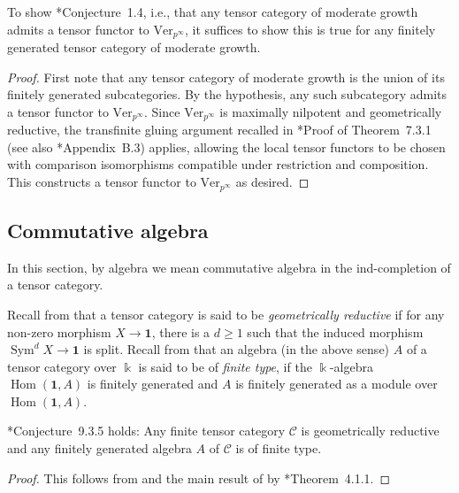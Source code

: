 \documentclass[11pt,oneside]{amsart}
\theoremstyle{definition}
\theoremstyle{remark}
\numberwithin{equation}{section}
\newcommand\cC{\mathcal C}
\newcommand\Ver{\mathrm{Ver}}
\newcommand\Sym{\operatorname{Sym}}
\renewcommand\:\colon
\newcommand\one{\mathbf{1}}
\newcommand\kk{\Bbbk}
\newcommand\Hom{\operatorname{Hom}}
\begin{document}
\begin{proposition} To show \cite{BEO}*{Conjecture~1.4}, i.e., that any tensor category of moderate growth admits a tensor functor to $\Ver_{p^\infty}$, it suffices to show this is true for any finitely generated tensor category of moderate growth.
\end{proposition}

\begin{proof} First note that any tensor category of moderate growth is the union of its finitely generated subcategories. By the hypothesis, any such subcategory admits a tensor functor to $\Ver_{p^\infty}$. Since $\Ver_{p^\infty}$ is maximally nilpotent and geometrically reductive, the transfinite gluing argument recalled in \cite{CEO-incompressible}*{Proof of Theorem~7.3.1} (see also \cite{CS-flat}*{Appendix~B.3}) applies, allowing the local tensor functors to be chosen with comparison isomorphisms compatible under restriction and composition. This constructs a tensor functor to $\Ver_{p^\infty}$ as desired.
\end{proof}


\subsection{Commutative algebra} In this section, by algebra we mean commutative algebra in the ind-completion of a tensor category.

Recall from \cites{Cou-commalg,Cou-gr} that a tensor category is said to be \emph{geometrically reductive} if for any non-zero morphism $X\to\one$, there is a $d\ge1$ such that the induced morphism $\Sym^d X\to\one$ is split. Recall from \cite{CEO-incompressible} that an algebra (in the above sense) $A$ of a tensor category over $\kk$ is said to be of \emph{finite type}, if the $\kk$-algebra $\Hom(\one,A)$ is finitely generated and $A$ is finitely generated as a module over $\Hom(\one,A)$.

\begin{proposition} \cite{CEO-incompressible}*{Conjecture~9.3.5} holds: Any finite tensor category $\cC$ is geometrically reductive and any finitely generated algebra $A$ of $\cC$ is of finite type.
\end{proposition}

\begin{proof} This follows from  and the main result of \cite{CF-beo} by \cite{Cou-gr}*{Theorem~4.1.1}.
\end{proof}
\end{document}
